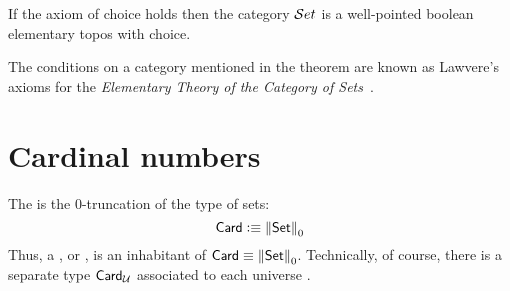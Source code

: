 \documentclass[hott-all.tex]{subfiles}
\begin{document}
% 
% 
% 
% 
\begin{thm}
  If the axiom of choice holds then the category $\mathcal{S}et$ is a well-pointed boolean elementary topos with choice.
\end{thm}
% 
% 
\begin{rmk}
  The conditions on a category mentioned in the theorem are known as Lawvere's
  axioms for the \emph{Elementary Theory of the Category of Sets}~\cite{lawvere:etcs-long}.
\end{rmk}
% 
\section{Cardinal numbers}
% 
\begin{defn}
  The 
  is the 0-truncation of the type \set of sets:
  \[ \mathsf{Card} \vcentcolon\equiv \mathopen{}\left\Vert \mathsf{Set}\right\Vert_{0}\mathclose{} \]
  Thus, a , or , is an inhabitant of $\mathsf{Card}\equiv \mathopen{}\left\Vert \mathsf{Set}\right\Vert_{0}\mathclose{}$.
  Technically, of course, there is a separate type $\mathsf{Card}_\mathcal{U}$ associated to each universe \type.
\end{defn}
% 
\end{document}
